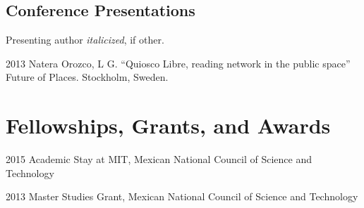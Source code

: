 \documentclass{academiccv}
\begin{document}

	
	


	


\subsection*{Conference Presentations}

Presenting author \textit{italicized}, if other.\bigskip

\begin{tablist}

\item[2013] \tab Natera Orozco, L G. \enquote{Quiosco Libre, reading network in the public space} Future of Places. Stockholm,  Sweden.

\end{tablist}



\section*{Fellowships, Grants, and Awards}

\begin{tablist}
	
\item[2015] \tab Academic Stay at MIT, Mexican National Council of Science and Technology 

\item[2013] \tab Master Studies Grant, Mexican National Council of Science and Technology

\end{tablist}
\end{document}
